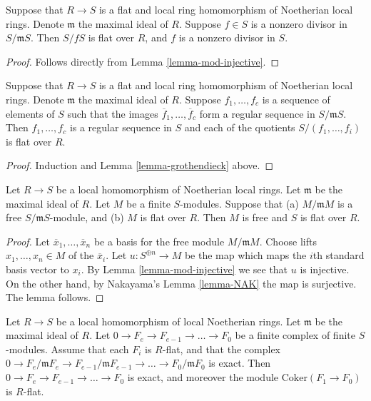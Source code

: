 \begin{lemma}
\label{lemma-grothendieck}
Suppose that $R \to S$ is a flat and local ring homomorphism of Noetherian
local rings. Denote $\mathfrak m$ the maximal ideal of $R$.
Suppose $f \in S$ is a nonzero divisor in $S/{\mathfrak m}S$.
Then $S/fS$ is flat over $R$, and $f$ is a nonzero divisor in $S$.
\end{lemma}

\begin{proof}
Follows directly from Lemma \ref{lemma-mod-injective}.
\end{proof}

\begin{lemma}
\label{lemma-grothendieck-regular-sequence}
Suppose that $R \to S$ is a flat and local ring homomorphism of Noetherian
local rings. Denote $\mathfrak m$ the maximal ideal of $R$.
Suppose $f_1, \ldots, f_c$ is a sequence of elements of
$S$ such that the images $\overline{f}_1, \ldots, \overline{f}_c$
form a regular sequence in $S/{\mathfrak m}S$.
Then $f_1, \ldots, f_c$ is a regular sequence in $S$ and each
of the quotients $S/(f_1, \ldots, f_i)$ is flat over $R$.
\end{lemma}

\begin{proof}
Induction and Lemma \ref{lemma-grothendieck} above.
\end{proof}

\begin{lemma}
\label{lemma-free-fibre-flat-free}
Let $R \to S$ be a local homomorphism of Noetherian
local rings. Let $\mathfrak m$ be the maximal
ideal of $R$. Let $M$ be a finite $S$-modules.
Suppose that (a) $M/\mathfrak mM$
is a free $S/\mathfrak mS$-module, and (b) $M$ is flat over $R$.
Then $M$ is free and $S$ is flat over $R$.
\end{lemma}

\begin{proof}
Let $\overline{x}_1,\ldots,\overline{x}_n$ be a basis
for the free module $M/\mathfrak mM$. Choose lifts
$x_1,\ldots,x_n \in M$ of the $\overline{x}_i$. Let
$u : S^{\oplus n} \to M$ be the map which maps the $i$th
standard basis vector to $x_i$. By Lemma \ref{lemma-mod-injective}
we see that $u$ is injective. On the other hand, by
Nakayama's Lemma \ref{lemma-NAK} the map is surjective. The
lemma follows.
\end{proof}

\begin{lemma}
\label{lemma-complex-exact-mod}
Let $R \to S$ be a local homomorphism of local Noetherian
rings. Let $\mathfrak m$ be the maximal ideal of $R$.
Let $0 \to F_e \to F_{e-1} \to \ldots \to F_0$
be a finite complex of finite $S$-modules. Assume that
each $F_i$ is $R$-flat, and that the complex
$0 \to F_e/\mathfrak m F_e \to F_{e-1}/\mathfrak m F_{e-1}
\to \ldots \to F_0 / \mathfrak m F_0$ is exact.
Then $0 \to F_e \to F_{e-1} \to \ldots \to F_0$
is exact, and moreover the module
$\text{Coker}(F_1 \to F_0)$ is $R$-flat.
\end{lemma}

